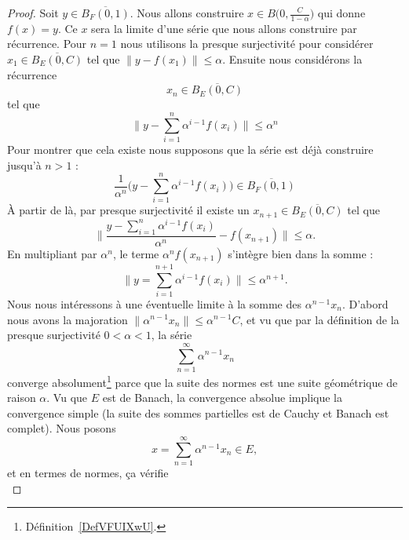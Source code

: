 \begin{proof}
	Soit \( y\in \overline{ B_F(0,1) }\). Nous allons construire \( x\in B\big( 0,\frac{ C }{ 1-\alpha } \big)\) qui donne \( f(x)=y\). Ce \( x\) sera la limite d'une série que nous allons construire par récurrence. Pour \( n=1\) nous utilisons la presque surjectivité pour considérer \( x_1\in\overline{ B_E(0,C) } \) tel que \( \| y-f(x_1) \|\leq \alpha\). Ensuite nous considérons la récurrence
	\begin{equation}
		x_n\in \overline{ B_E(0,C) }
	\end{equation}
	tel que
	\begin{equation}
		\big\| y-\sum_{i=1}^n\alpha^{i-1}f(x_i) \big\|\leq \alpha^n
	\end{equation}
	Pour montrer que cela existe nous supposons que la série est déjà construire jusqu'à \( n>1\) :
	\begin{equation}
		\frac{1}{ \alpha^n }\Big( y-\sum_{i=1}^n\alpha^{i-1}f(x_i) \Big)\in \overline{ B_F(0,1) }
	\end{equation}
	À partir de là, par presque surjectivité il existe un \( x_{n+1}\in \overline{ B_E(0,C) }\) tel que
	\begin{equation}
		\big\| \frac{ y-\sum_{i=1}^n\alpha^{i-1}f(x_i) }{ \alpha^n }-f(x_{n+1}) \big\|\leq \alpha.
	\end{equation}
	En multipliant par \( \alpha^{n}\), le terme \( \alpha^nf(x_{n+1})\) s'intègre bien dans la somme :
	\begin{equation}
		\big\| y=\sum_{i=1}^{n+1}\alpha^{i-1}f(x_i) \big\|\leq \alpha^{n+1}.
	\end{equation}
	Nous nous intéressons à une éventuelle limite à la somme des \( \alpha^{n-1}x_n\). D'abord nous avons la majoration \( \| \alpha^{n-1}x_n \|\leq \alpha^{n-1}C\), et vu que par la définition de la presque surjectivité \( 0<\alpha<1\), la série
	\begin{equation}
		\sum_{n=1}^{\infty}\alpha^{n-1}x_n
	\end{equation}
	converge absolument\footnote{Définition~\ref{DefVFUIXwU}.} parce que la suite des normes est une suite géométrique de raison \( \alpha\). Vu que \( E\) est de Banach, la convergence absolue implique la convergence simple (la suite des sommes partielles est de Cauchy et Banach est complet). Nous posons
	\begin{equation}
		x=\sum_{n=1}^{\infty}\alpha^{n-1}x_n\in E,
	\end{equation}
	et en termes de normes, ça vérifie
	\begin{equation}

\end{equation}
\end{proof}
